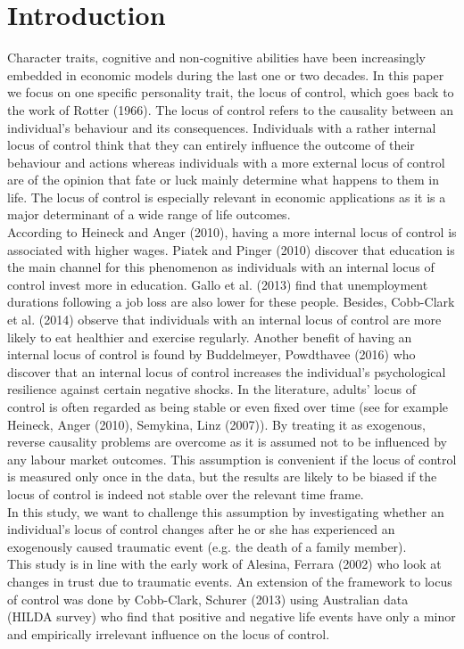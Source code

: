 \documentclass[12pt,a4paper,fleqn]{article}
\begin{document}
\section{Introduction}
Character traits, cognitive and non-cognitive abilities have been increasingly embedded in economic models during the last one or two decades. In this paper we focus on one specific personality trait, the locus of control, which goes back to the work of Rotter (1966). The locus of control refers to the causality between an individual's behaviour and its consequences. Individuals with a rather internal locus of control think that they can entirely influence the outcome of their behaviour and actions whereas individuals with a more external locus of control are of the opinion that fate or luck mainly determine what happens to them in life.
The locus of control is especially relevant in economic applications as it is a major determinant of a wide range of life outcomes. \\
According to Heineck and Anger (2010), having a more internal locus of control is associated with higher wages. Piatek and Pinger (2010) discover that education is the main channel for this phenomenon as individuals with an internal locus of control invest more in education. Gallo et al. (2013) find that unemployment durations following a job loss are also lower for these people. Besides, Cobb-Clark et al. (2014) observe that individuals with an internal locus of control are more likely to eat healthier and exercise regularly. Another benefit of having an internal locus of control is found by Buddelmeyer, Powdthavee (2016) who discover that an internal locus of control increases the individual's psychological resilience against certain negative shocks. 
In the literature, adults' locus of control is often regarded as being stable or even fixed over time (see for example Heineck, Anger (2010), Semykina, Linz (2007)). By treating it as exogenous, reverse causality problems are overcome as it is assumed not to be influenced by any labour market outcomes. This assumption is convenient if the locus of control is measured only once in the data, but the results are likely to be biased if the locus of control is indeed not stable over the relevant time frame. \\
In this study, we want to challenge this assumption by investigating whether an individual's locus of control changes after he or she has experienced an exogenously caused traumatic event (e.g. the death of a family member). \\
This study is in line with the early work of Alesina, Ferrara (2002) who look at changes in trust due to traumatic events. An extension of the framework to locus of control was done by Cobb-Clark, Schurer (2013) using Australian data (HILDA survey) who find that positive and negative life events have only a minor and empirically irrelevant  influence on the locus of control. 
\end{document}
